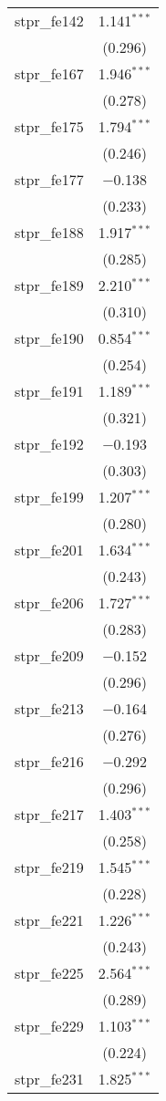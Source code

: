 \begin{table}[!htbp]
\begin{tabular}{@{\extracolsep{5pt}}lc}
  stpr\_fe142 & 1.141$^{***}$ \\ 
  & (0.296) \\ 
  stpr\_fe167 & 1.946$^{***}$ \\ 
  & (0.278) \\ 
  stpr\_fe175 & 1.794$^{***}$ \\ 
  & (0.246) \\ 
  stpr\_fe177 & $-$0.138 \\ 
  & (0.233) \\ 
  stpr\_fe188 & 1.917$^{***}$ \\ 
  & (0.285) \\ 
  stpr\_fe189 & 2.210$^{***}$ \\ 
  & (0.310) \\ 
  stpr\_fe190 & 0.854$^{***}$ \\ 
  & (0.254) \\ 
  stpr\_fe191 & 1.189$^{***}$ \\ 
  & (0.321) \\ 
  stpr\_fe192 & $-$0.193 \\ 
  & (0.303) \\ 
  stpr\_fe199 & 1.207$^{***}$ \\ 
  & (0.280) \\ 
  stpr\_fe201 & 1.634$^{***}$ \\ 
  & (0.243) \\ 
  stpr\_fe206 & 1.727$^{***}$ \\ 
  & (0.283) \\ 
  stpr\_fe209 & $-$0.152 \\ 
  & (0.296) \\ 
  stpr\_fe213 & $-$0.164 \\ 
  & (0.276) \\ 
  stpr\_fe216 & $-$0.292 \\ 
  & (0.296) \\ 
  stpr\_fe217 & 1.403$^{***}$ \\ 
  & (0.258) \\ 
  stpr\_fe219 & 1.545$^{***}$ \\ 
  & (0.228) \\ 
  stpr\_fe221 & 1.226$^{***}$ \\ 
  & (0.243) \\ 
  stpr\_fe225 & 2.564$^{***}$ \\ 
  & (0.289) \\ 
  stpr\_fe229 & 1.103$^{***}$ \\ 
  & (0.224) \\ 
  stpr\_fe231 & 1.825$^{***}$ \\ 

\end{tabular}
\end{table}

